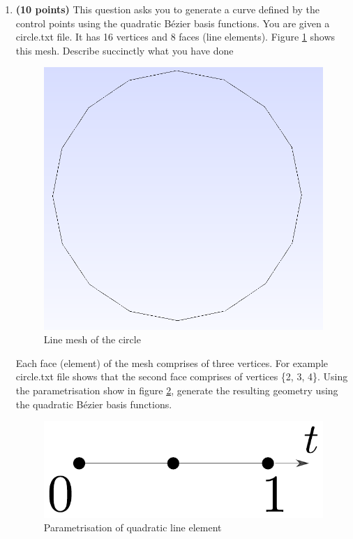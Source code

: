 \documentclass[a4paper, 11pt]{article}
\begin{document}
\begin{enumerate}
\item \textbf{(10 points)} This question asks you to generate a curve defined by the control points using the quadratic B\'{e}zier basis functions. You are given a circle.txt file. It has 16 vertices and 8 faces (line elements). Figure \ref{fig:lineMesh} shows this mesh. Describe succinctly what you have done

\begin{figure}
\includegraphics[scale=0.25]{resources/circleMesh.png} 
\centering
\caption{Line mesh of the circle}
\label{fig:lineMesh}
\end{figure}

Each face (element) of the mesh comprises of three vertices. For example circle.txt file shows that the second face comprises of vertices \{2, 3, 4\}. Using the parametrisation show in figure \ref{fig:lineElement}, generate the resulting geometry using the quadratic B\'{e}zier basis functions.
\begin{figure}
\includegraphics[scale=0.5]{resources/quadraticLineElement.pdf} 
\centering
\caption{Parametrisation of quadratic line element}
\label{fig:lineElement}
\end{figure}


\end{enumerate}
\end{document}
